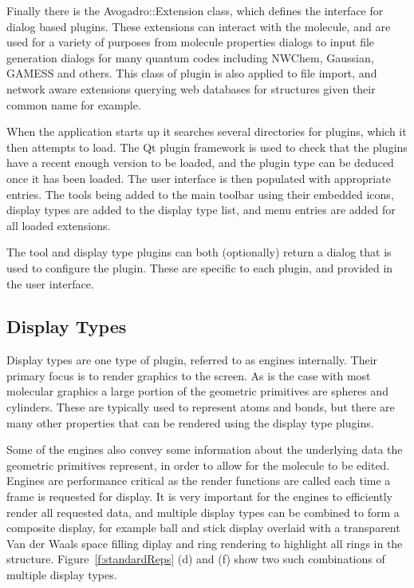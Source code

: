 \documentclass[10pt]{bmc_article}
\newenvironment{bmcformat}{\begin{raggedright}
\baselineskip20pt\sloppy\setboolean{publ}{false}}{\end{raggedright}
\baselineskip20pt\sloppy}
\begin{document}
\begin{bmcformat}
Finally there is the Avogadro::Extension class, which defines the interface for
dialog based plugins. These extensions can interact with the molecule, and are
used for a variety of purposes from molecule properties dialogs to input file
generation dialogs for many quantum codes including NWChem, Gaussian, GAMESS and
others. This class of plugin is also applied to file import, and network aware
extensions querying web databases for structures given their common name for
example.

When the application starts up it searches several directories for plugins,
which it then attempts to load. The Qt plugin framework is used to check that
the plugins have a recent enough version to be loaded, and the plugin type can
be deduced once it has been loaded. The user interface is then populated with
appropriate entries. The tools being added to the main toolbar using their
embedded icons, display types are added to the display type list, and menu
entries are added for all loaded extensions.

The tool and display type plugins can both (optionally) return a dialog that is
used to configure the plugin. These are specific to each plugin, and provided in
the user interface.

\subsection{Display Types}

Display types are one type of plugin, referred to as engines internally. Their
primary focus is to render graphics to the screen. As is the case with most
molecular graphics a large portion of the geometric primitives are spheres and
cylinders. These are typically used to represent atoms and bonds, but there are
many other properties that can be rendered using the display type plugins.

Some of the engines also convey some information about the underlying data the
geometric primitives represent, in order to allow for the molecule to be edited.
Engines are performance critical as the render functions are called each time a
frame is requested for display. It is very important for the engines to
efficiently render all requested data, and multiple display types can be
combined to form a composite display, for example ball and stick display
overlaid with a transparent Van der Waals space filling diplay and ring
rendering to highlight all rings in the structure. Figure~\ref{f:standardReps}
(d) and (f) show two such combinations of multiple display types.


\end{bmcformat}
\end{document}

